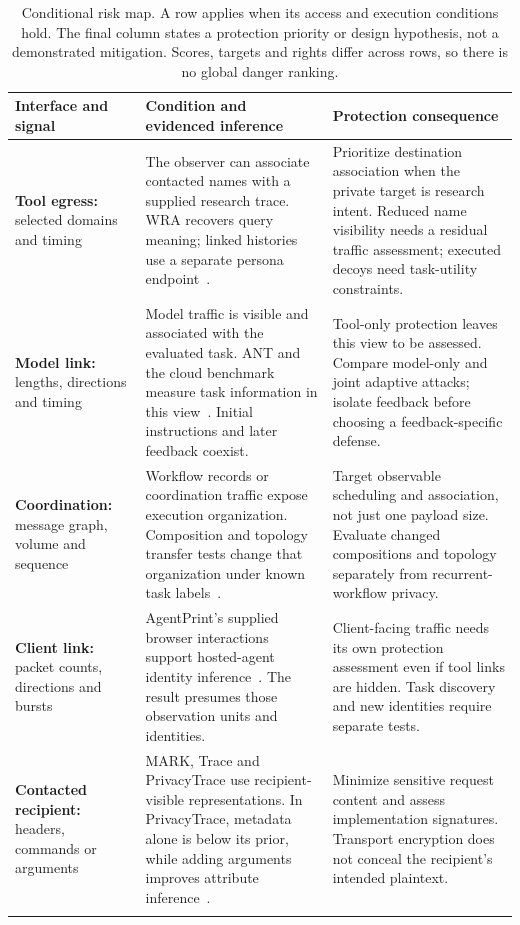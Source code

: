 \begin{table}[t]\centering\small
\caption{Conditional risk map. A row applies when its access and execution conditions hold. The final column states a protection priority or design hypothesis, not a demonstrated mitigation. Scores, targets and rights differ across rows, so there is no global danger ranking.}\label{tab:conditional-risk}
\setlength{\tabcolsep}{4pt}
\begin{tabularx}{\textwidth}{@{}P{.23\textwidth}P{.43\textwidth}Y@{}}\toprule
Interface and signal & Condition and evidenced inference & Protection consequence \\\midrule
\textbf{Tool egress:} selected domains and timing & The observer can associate contacted names with a supplied research trace. WRA recovers query meaning; linked histories use a separate persona endpoint~\cite{jeong2026wra}. & Prioritize destination association when the private target is research intent. Reduced name visibility needs a residual traffic assessment; executed decoys need task-utility constraints. \\\addlinespace[4pt]
\textbf{Model link:} lengths, directions and timing & Model traffic is visible and associated with the evaluated task. ANT and the cloud benchmark measure task information in this view~\cite{li2026ant,pouryousef2026traffic}. Initial instructions and later feedback coexist. & Tool-only protection leaves this view to be assessed. Compare model-only and joint adaptive attacks; isolate feedback before choosing a feedback-specific defense. \\\addlinespace[4pt]
\textbf{Coordination:} message graph, volume and sequence & Workflow records or coordination traffic expose execution organization. Composition and topology transfer tests change that organization under known task labels~\cite{dangol2026workflow,pouryousef2026traffic}. & Target observable scheduling and association, not just one payload size. Evaluate changed compositions and topology separately from recurrent-workflow privacy. \\\addlinespace[4pt]
\textbf{Client link:} packet counts, directions and bursts & AgentPrint's supplied browser interactions support hosted-agent identity inference~\cite{agentprint2025}. The result presumes those observation units and identities. & Client-facing traffic needs its own protection assessment even if tool links are hidden. Task discovery and new identities require separate tests. \\\addlinespace[4pt]
\textbf{Contacted recipient:} headers, commands or arguments & MARK, Trace and PrivacyTrace use recipient-visible representations. In PrivacyTrace, metadata alone is below its prior, while adding arguments improves attribute inference~\cite{kang2026whoseagent,ediga2026trace,duan2026privacytrace}. & Minimize sensitive request content and assess implementation signatures. Transport encryption does not conceal the recipient's intended plaintext. \\\addlinespace[4pt]

\end{tabularx}
\end{table}
